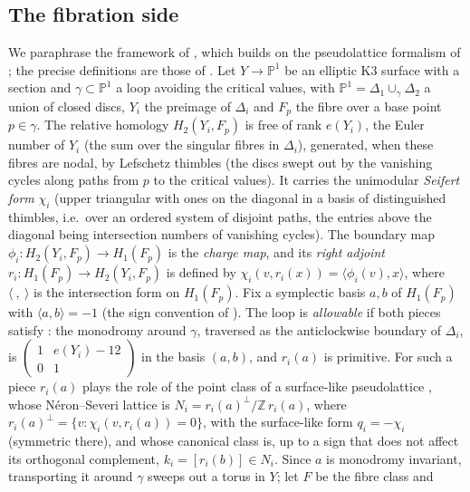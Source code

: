 \documentclass[11pt]{article}
\newcommand{\Z}{\mathbb Z}
\newcommand{\PP}{\mathbb P}
\theoremstyle{definition}
\theoremstyle{remark}
\begin{document}
\subsection{The fibration side}\label{sec:fibside}

We paraphrase the framework of \cite[\S\S2,4,5]{GT}, which builds on
the pseudolattice formalism of \cite{Kuz,HT}; the precise definitions
are those of \cite{GT}. Let \(Y\to\PP^1\) be an elliptic K3 surface
with a section and \(\gamma\subset\PP^1\) a loop avoiding the critical
values, with \(\PP^1=\Delta_1\cup_\gamma\Delta_2\) a union of closed
discs, \(Y_i\) the preimage of \(\Delta_i\) and \(F_p\) the fibre over
a base point \(p\in\gamma\). The relative homology \(H_2(Y_i,F_p)\) is
free of rank \(e(Y_i)\), the Euler number of \(Y_i\) (the sum over the
singular fibres in \(\Delta_i\)), generated, when these fibres are nodal,
by Lefschetz thimbles (the discs swept out by the vanishing cycles
along paths from \(p\) to the critical values). It carries the
unimodular \emph{Seifert form} \(\chi_i\) (upper triangular with ones
on the diagonal in a basis of distinguished thimbles, i.e.\ over an
ordered system of disjoint paths, the entries above the diagonal being
intersection numbers of vanishing cycles). The boundary map
\(\phi_i\colon H_2(Y_i,F_p)\to H_1(F_p)\) is the \emph{charge map}, and
its \emph{right adjoint} \(r_i\colon H_1(F_p)\to H_2(Y_i,F_p)\) is
defined by \(\chi_i(v,r_i(x))=\langle\phi_i(v),x\rangle\), where
\(\langle\ ,\ \rangle\) is the intersection form on \(H_1(F_p)\). Fix a
symplectic basis \(a,b\) of \(H_1(F_p)\) with \(\langle a,b\rangle=-1\)
(the sign convention of \cite{GT}). The loop is \emph{allowable}
\cite[Definition~4.11]{GT} if both pieces satisfy
\cite[Assumption~4.9]{GT}: the monodromy around \(\gamma\), traversed
as the anticlockwise boundary of \(\Delta_i\), is
\(\left(\begin{smallmatrix}1&e(Y_i)-12\\0&1\end{smallmatrix}\right)\)
in the basis \((a,b)\), and \(r_i(a)\) is primitive. For such a piece
\(r_i(a)\) plays the role of the point class of a surface-like
pseudolattice \cite[\S\S2,4]{GT}, whose N\'eron--Severi lattice is
\(N_i=r_i(a)^\perp/\Z\,r_i(a)\), where
\(r_i(a)^\perp=\{v:\chi_i(v,r_i(a))=0\}\), with the surface-like form
\(q_i=-\chi_i\) (symmetric there), and whose canonical class is, up to a sign that does
not affect its orthogonal complement, \(k_i=[r_i(b)]\in N_i\). Since
\(a\) is monodromy invariant, transporting it around \(\gamma\) sweeps
out a torus in \(Y\); let \(F\) be the fibre class and
\end{document}
